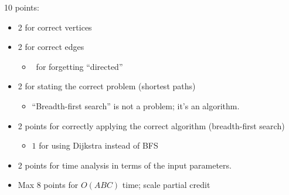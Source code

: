 \documentclass[11pt]{article}
\begin{document}
\begin{enumerate}
\begin{rubric}
10 points:
\begin{itemize}\cramped
\item 2 for correct vertices
\item 2 for correct edges
\begin{itemize}\cramped
\item $\!\!\!$\textonehalf\ for forgetting “directed”
\end{itemize}
\item 2 for stating the correct problem (shortest paths)
\begin{itemize}\cramped
\item “Breadth-first search” is not a problem; it’s an algorithm.
\end{itemize}
\item 2 points for correctly applying the correct algorithm (breadth-first search)
\begin{itemize}\cramped
\item $\!\!\!1$ for using Dijkstra instead of BFS
\end{itemize}
\item 2 points for time analysis in terms of the input parameters.
\item Max 8 points for $O(ABC)$ time; scale partial credit
\end{itemize}
\end{rubric}


\end{enumerate}
\end{document}
